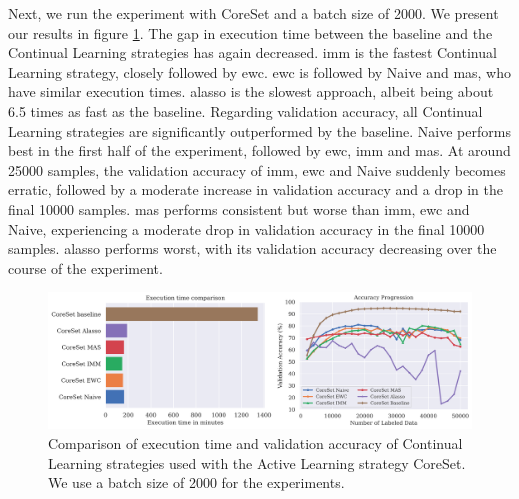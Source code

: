 Next, we run the experiment with CoreSet and a batch size of 2000. We present our results in figure \ref{fig:Evaluation:Results:CAL:CoreSet2000}. The gap in execution time between the baseline and the
Continual Learning strategies has again decreased. \gls{imm} is the fastest Continual Learning strategy, closely followed by \gls{ewc}. \gls{ewc} is followed by Naive and \gls{mas}, who have similar execution times. \gls{alasso} is
the slowest approach, albeit being about 6.5 times as fast as the baseline. Regarding validation accuracy, all Continual Learning strategies are significantly outperformed by the baseline. Naive performs best
in the first half of the experiment, followed by \gls{ewc}, \gls{imm} and \gls{mas}. At around 25000 samples, the validation accuracy of \gls{imm}, \gls{ewc} and Naive suddenly becomes erratic, followed by a moderate increase in validation
accuracy and a drop in the final 10000 samples. \gls{mas} performs consistent but worse than \gls{imm}, \gls{ewc} and Naive, experiencing a moderate drop in validation accuracy in the final 10000 samples. \gls{alasso} performs worst,
with its validation accuracy decreasing over the course of the experiment. \par

\begin{figure}[h]
    \centering
    \includegraphics[width=\linewidth]{images/results_CAL/CoreSet_CAL_2000b.png}
    \caption[Continual Active Learning CoreSet 2000 batch size]{Comparison of execution time and validation accuracy of Continual Learning strategies used with the Active Learning strategy
    CoreSet. We use a batch size of 2000 for the experiments.}
    \label{fig:Evaluation:Results:CAL:CoreSet2000}
\end{figure}


